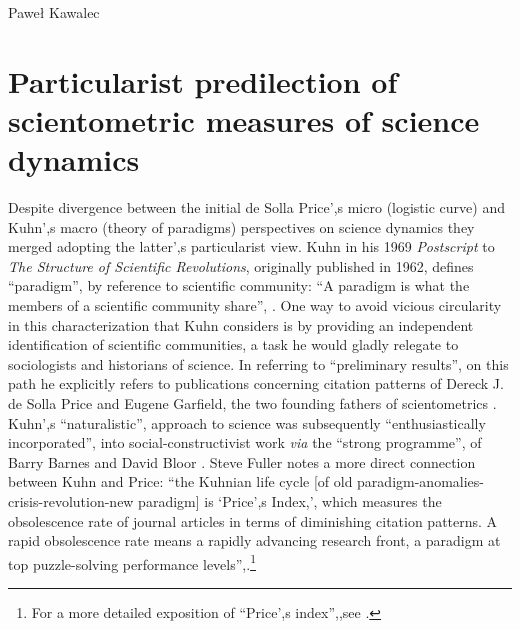 \begin{artengenv}{Paweł Kawalec}
\section{Particularist predilection of scientometric measures of science dynamics}
Despite divergence between the initial de Solla Price',s micro (logistic curve) and Kuhn',s macro (theory of paradigms) perspectives on science dynamics
\parencite[][]{shapin_kuhns_2015} %
 they merged adopting the latter',s particularist view. Kuhn in his 1969 \textit{Postscript} to \textit{The Structure of Scientific Revolutions}, originally published in 1962, defines ``paradigm'', by reference to scientific community: ``A paradigm is what the members of a scientific community share'', 
\parencite[][p.176]{kuhn_structure_1970}. %
 One way to avoid vicious circularity in this characterization that Kuhn considers is by providing an independent identification of scientific communities, a task he would gladly relegate to sociologists and historians of science. In referring to ``preliminary results'', on this path he explicitly refers to publications concerning citation patterns of Dereck J. de Solla Price and Eugene Garfield, the two founding fathers of scientometrics 
\parencite[][p.178 n.6]{kuhn_structure_1970}. %
 Kuhn',s ``naturalistic'', approach to science was subsequently ``enthusiastically incorporated'', into social-constructivist work \textit{via} the ``strong programme'', of Barry Barnes and David Bloor 
\parencite[][]{shapin_kuhns_2015}. %
 Steve Fuller 
\parencite[][p.270 n.107]{fuller_being_1992} %
 notes a more direct connection between Kuhn and Price: ``the Kuhnian life cycle [of old paradigm-anomalies-crisis-revolution-new paradigm] is ‘Price',s Index,', which measures the obsolescence rate of journal articles in terms of diminishing citation patterns. A rapid obsolescence rate means a rapidly advancing research front, a paradigm at top puzzle-solving performance levels'',.\footnote{For a more detailed exposition of ``Price',s index'',,see 
\parencite[][pp.148–170]{de_mey_cognitive_1982}.%
}


\end{artengenv}
